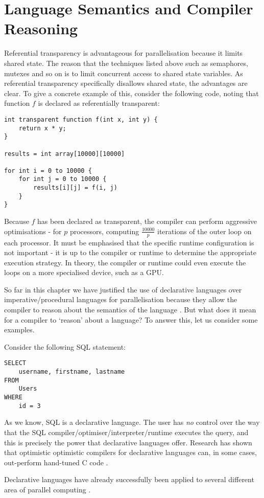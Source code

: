 \section{Language Semantics and Compiler Reasoning} \label{sec:introduction/reasoning}
Referential transparency is advantageous for parallelisation because it limits shared state. The reason that the techniques listed above such as semaphores, mutexes and so on is to limit concurrent access to shared state variables. As referential transparency specifically disallows shared state, the advantages are clear. To give a concrete example of this, consider the following code, noting that function $f$ is declared as referentially transparent:

\begin{verbatim}
int transparent function f(int x, int y) {
    return x * y;
}

results = int array[10000][10000]

for int i = 0 to 10000 {
    for int j = 0 to 10000 {
        results[i][j] = f(i, j)
    }
}
\end{verbatim}

Because $f$ has been declared as transparent, the compiler can perform aggressive optimisations - \eg for $p$ processors, computing $\frac{10000}{p}$ iterations of the outer loop on each processor. It must be emphasised that the specific runtime configuration is not important - it is up to the compiler or runtime to determine the appropriate execution strategy. In theory, the compiler or runtime could even execute the loops on a more specialised device, such as a GPU.

So far in this chapter we have justified the use of declarative languages over imperative/procedural languages for parallelisation because they allow the compiler to reason about the semantics of the language \citep{PeytonJones2011}. But what does it mean for a compiler to `reason' about a language? To answer this, let us consider some examples.

Consider the following SQL statement:

\begin{verbatim}
SELECT
    username, firstname, lastname
FROM
    Users
WHERE
    id = 3
\end{verbatim}

As we know, SQL is a declarative language. The user has \emph{no} control over the way that the SQL compiler/optimiser/interpreter/runtime executes the query, and this is precisely the power that declarative languages offer. Research has shown that optimistic optimistic compilers for declarative languages can, in some cases, out-perform hand-tuned C code \citep{Anderson2013,Mainland2013}.

Declarative languages have already successfully been applied to several different area of parallel computing \citep{Orchard2010,Grossman2011,Holk2011}.

